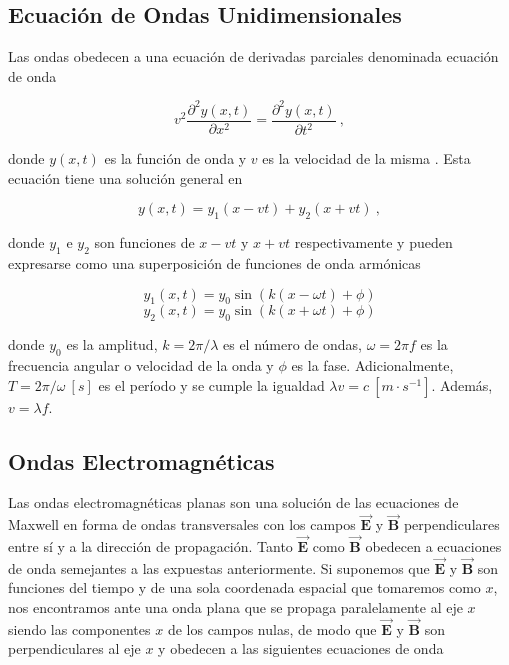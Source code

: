\documentclass{tufte-handout}
\begin{document}
\subsection{Ecuación de Ondas Unidimensionales}

Las ondas obedecen a una ecuación de derivadas parciales denominada ecuación de onda

\begin{equation}
v^2 \displaystyle\frac{\partial^2 y(x,t)}{\partial x^2} = \displaystyle\frac{\partial^2 y(x,t)}{\partial t^2}~,
\end{equation}

donde $y(x,t)$ es la función de onda y $v$ es la velocidad de la misma . Esta ecuación tiene una solución general en

\begin{equation}
y(x,t) = y_1(x - vt) + y_2(x + vt)~,
\end{equation}

donde $y_1$ e $y_2$ son funciones de $x-vt$ y $x+vt$ respectivamente y pueden expresarse como una superposición de funciones de onda armónicas

\begin{equation}
y_1(x,t) = y_0 \sin{(k(x - \omega t) + \phi)}
\end{equation}
\begin{equation}
y_2(x,t) = y_0 \sin{(k(x + \omega t) + \phi)}
\end{equation}

donde $y_0$ es la amplitud, $k = 2\pi / \lambda$ es el número de ondas, $\omega = 2\pi f$ es la frecuencia angular o velocidad de la onda y $\phi$ es la fase. Adicionalmente, $T = 2\pi/\omega~[s]$ es el período y se cumple la igualdad $\lambda v = c ~ [m\cdot s^{-1}]$. Además, $v = \lambda f$.

\subsection{Ondas Electromagnéticas}

Las ondas electromagnéticas planas son una solución de las ecuaciones de Maxwell en forma de ondas transversales con los campos $\mathbf{\vec{E}}$ y $\mathbf{\vec{B}}$ perpendiculares entre sí y a la dirección de propagación. Tanto $\mathbf{\vec{E}}$ como $\mathbf{\vec{B}}$ obedecen a ecuaciones de onda semejantes a las expuestas anteriormente. Si suponemos que $\mathbf{\vec{E}}$ y $\mathbf{\vec{B}}$ son funciones del tiempo y de una sola coordenada espacial que tomaremos como $x$, nos encontramos ante una onda plana que se propaga paralelamente al eje $x$ siendo las componentes $x$ de los campos nulas, de modo que $\mathbf{\vec{E}}$ y $\mathbf{\vec{B}}$ son perpendiculares al eje $x$ y obedecen a las siguientes ecuaciones de onda
\end{document}
